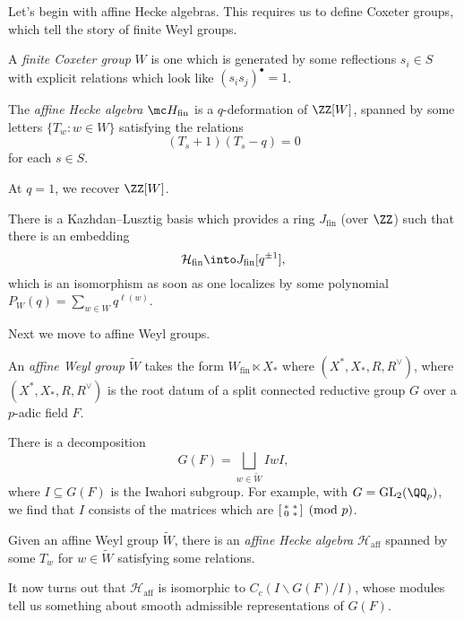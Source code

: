 \documentclass{article}
\begin{document}
Let's begin with affine Hecke algebras. This requires us to define Coxeter groups, which tell the story of finite Weyl groups.
\begin{definition}[Coxeter]
	A \textit{finite Coxeter group} $W$ is one which is generated by some reflections $s_i\in S$ with explicit relations which look like $(s_is_j)^\bullet=1$.
\end{definition}
\begin{definition}
	The \textit{affine Hecke algebra} $\mc H_{\mathrm{fin}}$ is a $q$-deformation of $\ZZ[W]$, spanned by some letters $\{T_w:w\in W\}$ satisfying the relations
	\[(T_s+1)(T_s-q)=0\]
	for each $s\in S$.
\end{definition}
\begin{example}
	At $q=1$, we recover $\ZZ[W]$.
\end{example}
\begin{remark}
	There is a Kazhdan--Lusztig basis which provides a ring $J_{\mathrm{fin}}$ (over $\ZZ$) such that there is an embedding
	\[\mathcal H_{\mathrm{fin}}\into J_{\mathrm{fin}}[q^{\pm1}],\]
	which is an isomorphism as soon as one localizes by some polynomial $P_W(q)=\sum_{w\in W}q^{\ell(w)}$. 
\end{remark}
Next we move to affine Weyl groups.
\begin{definition}
	An \textit{affine Weyl group} $\widetilde W$ takes the form $W_{\mathrm{fin}}\ltimes X_*$ where $(X^*,X_*,R,R^\lor)$, where $(X^*,X_*,R,R^\lor)$ is the root datum of a split connected reductive group $G$ over a $p$-adic field $F$.
\end{definition}
\begin{remark}
	There is a decomposition
	\[G(F)=\bigsqcup_{w\in\widetilde W}IwI,\]
	where $I\subseteq G(F)$ is the Iwahori subgroup. For example, with $G=\mathrm{GL}_2(\QQ_p)$, we find that $I$ consists of the matrices which are $\begin{bsmallmatrix}
		* & * \\ 0 & *
	\end{bsmallmatrix}\pmod p$.
\end{remark}
\begin{definition}
	Given an affine Weyl group $\widetilde W$, there is an \textit{affine Hecke algebra} $\mathcal H_{\mathrm{aff}}$ spanned by some $T_w$ for $w\in\widetilde W$ satisfying some relations.
\end{definition}
\begin{remark}
	It now turns out that $\mathcal H_{\mathrm{aff}}$ is isomorphic to $C_c(I\backslash G(F)/I)$, whose modules tell us something about smooth admissible representations of $G(F)$.
\end{remark}
\end{document}
